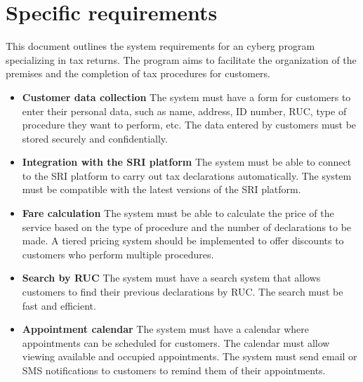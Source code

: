 \documentclass[12pt,a4paper, twosite]{article}
\begin{document}
\section{Specific requirements}
\label{sec:org40573d1}

This document outlines the system requirements for an cyberg program specializing in tax returns. The program aims to facilitate the organization of the premises and the completion of tax procedures for customers.

\begin{itemize}
\item
\textbf {Customer data collection}
The system must have a form for customers to enter their personal data, such as name, address, ID number, RUC, type of procedure they want to perform, etc. 
The data entered by customers must be stored securely and confidentially. 
\end{itemize}

\begin{itemize}
\item
\textbf {Integration with the SRI platform}
The system must be able to connect to the SRI platform to carry out tax declarations automatically. 
The system must be compatible with the latest versions of the SRI platform. 
\end{itemize}

\begin{itemize}
\item
\textbf {Fare calculation}
The system must be able to calculate the price of the service based on the type of procedure and the number of declarations to be made. 
A tiered pricing system should be implemented to offer discounts to customers who perform multiple procedures.
\end{itemize}

\begin{itemize}
\item
\textbf {Search by RUC}
The system must have a search system that allows customers to find their previous declarations by RUC. 
The search must be fast and efficient. 
\end{itemize}

\begin{itemize}
\item
\textbf {Appointment calendar}
The system must have a calendar where appointments can be scheduled for customers. 
The calendar must allow viewing available and occupied appointments. 
The system must send email or SMS notifications to customers to remind them of their appointments. 
\end{itemize}
\end{document}
